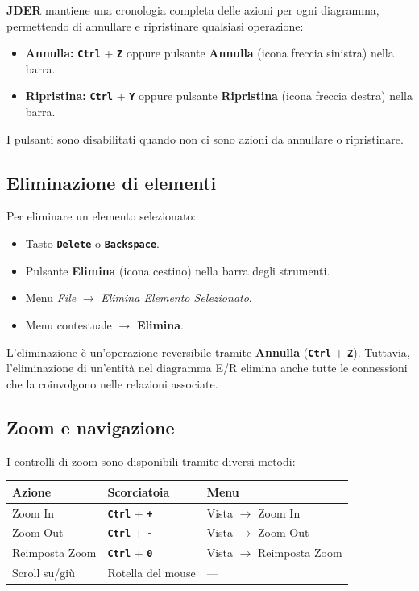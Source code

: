 \documentclass[a4paper,11pt]{article}
\newcommand{\key}[1]{\texttt{\textbf{#1}}}
\newcommand{\menu}[1]{\textit{#1}}
\newcommand{\uielement}[1]{\textbf{#1}}
\newcommand{\jder}{\textbf{JDER}}
\begin{document}
\jder{} mantiene una cronologia completa delle azioni per ogni diagramma, permettendo di
annullare e ripristinare qualsiasi operazione:

\begin{itemize}
  \item \textbf{Annulla:} \key{Ctrl} + \key{Z} oppure pulsante \uielement{Annulla} (icona freccia sinistra) nella barra.
  \item \textbf{Ripristina:} \key{Ctrl} + \key{Y} oppure pulsante \uielement{Ripristina} (icona freccia destra) nella barra.
\end{itemize}

I pulsanti sono disabilitati quando non ci sono azioni da annullare o ripristinare.

\subsection{Eliminazione di elementi}

Per eliminare un elemento selezionato:
\begin{itemize}
  \item Tasto \key{Delete} o \key{Backspace}.
  \item Pulsante \uielement{Elimina} (icona cestino) nella barra degli strumenti.
  \item Menu \menu{File} $\to$ \menu{Elimina Elemento Selezionato}.
  \item Menu contestuale $\to$ \uielement{Elimina}.
\end{itemize}

\begin{tcolorbox}[warnbox, title={Attenzione}]
  L'eliminazione è un'operazione reversibile tramite \textbf{Annulla} (\key{Ctrl} + \key{Z}).
  Tuttavia, l'eliminazione di un'entità nel diagramma E/R elimina anche tutte le connessioni
  che la coinvolgono nelle relazioni associate.
\end{tcolorbox}

\subsection{Zoom e navigazione}

I controlli di zoom sono disponibili tramite diversi metodi:

\begin{center}
\begin{tabular}{@{}lll@{}}
  \toprule
  \textbf{Azione} & \textbf{Scorciatoia} & \textbf{Menu} \\
  \midrule
  Zoom In         & \key{Ctrl} + \key{+} & Vista $\to$ Zoom In \\
  Zoom Out        & \key{Ctrl} + \key{-} & Vista $\to$ Zoom Out \\
  Reimposta Zoom  & \key{Ctrl} + \key{0} & Vista $\to$ Reimposta Zoom \\
  Scroll su/giù  & Rotella del mouse    & --- \\
  \bottomrule
\end{tabular}
\end{center}
\end{document}
